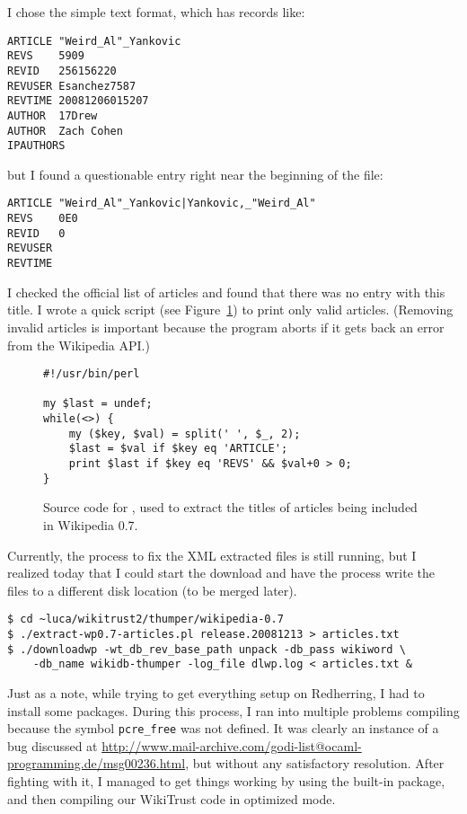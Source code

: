 I chose the simple text format, which has records like:
\begin{verbatim}
ARTICLE "Weird_Al"_Yankovic
REVS    5909
REVID   256156220
REVUSER Esanchez7587
REVTIME 20081206015207
AUTHOR  17Drew
AUTHOR  Zach Cohen
IPAUTHORS
\end{verbatim}
but I found a questionable entry right near the beginning
of the file:
\begin{verbatim}
ARTICLE "Weird_Al"_Yankovic|Yankovic,_"Weird_Al"
REVS    0E0
REVID   0
REVUSER 
REVTIME 
\end{verbatim}
I checked the official list of articles and found that
there was no entry with this title.
I wrote a quick  script
(see Figure~\ref{fig:redherring-wp0.7-scan.pl})
to print only valid articles.
(Removing invalid articles is important because
the  program aborts if it gets back
an error from the Wikipedia API.)
\begin{figure}
\lstset{language=Perl}
\begin{fminipage}
\begin{lstlisting}
#!/usr/bin/perl

my $last = undef;
while(<>) {
    my ($key, $val) = split(' ', $_, 2);
    $last = $val if $key eq 'ARTICLE';
    print $last if $key eq 'REVS' && $val+0 > 0;
}
\end{lstlisting}
\end{fminipage}
\caption[File \texttt{extract-wp0.7-articles.pl}]{
    Source code for ,
used to extract the titles of articles being included
in Wikipedia 0.7.
}
\label{fig:redherring-wp0.7-scan.pl}
\end{figure}


Currently, the process to fix the XML extracted files is
still running, but I realized today that I could start the
download and have the process write the files to a different
disk location (to be merged later).
\begin{verbatim}
$ cd ~luca/wikitrust2/thumper/wikipedia-0.7
$ ./extract-wp0.7-articles.pl release.20081213 > articles.txt
$ ./downloadwp -wt_db_rev_base_path unpack -db_pass wikiword \
    -db_name wikidb-thumper -log_file dlwp.log < articles.txt &
\end{verbatim}


Just as a note, while trying to get everything setup on Redherring,
I had to install some \program{godi} packages.
During this process, I ran into multiple problems compiling because
\indexprogram{pcre\_free}
the symbol \texttt{pcre\_free} was not defined.
It was clearly an instance of a bug discussed at
\url{http://www.mail-archive.com/godi-list@ocaml-programming.de/msg00236.html},
but without any satisfactory resolution.
After fighting with it, I managed to get things working by
using the built-in  package, and then
compiling our WikiTrust code in optimized mode.


